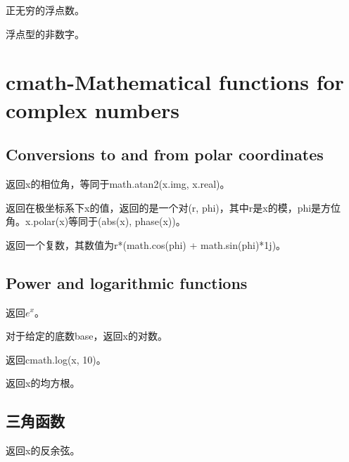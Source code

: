 \noindent{\color{red}{math.inf:}}
\par{正无穷的浮点数。}\\

\noindent{\color{red}{math.nan:}}
\par{浮点型的非数字。}\\





\section{cmath-Mathematical functions for complex numbers}
\subsection{Conversions to and from polar coordinates}
\noindent{\color{red}{cmath.phase(x):}}
\par{返回x的相位角，等同于math.atan2(x.img, x.real)。}\\

\noindent{\color{red}{cmath.polar(x):}}
\par{返回在极坐标系下x的值，返回的是一个对(r, phi)，其中r是x的模，phi是方位角。x.polar(x)等同于(abs(x), phase(x))。}\\

\noindent{\color{red}{cmath.rect(r, phi):}}
\par{返回一个复数，其数值为r*(math.cos(phi) + math.sin(phi)*1j)。}\\

\subsection{Power and logarithmic functions}
\noindent{\color{red}{cmath.exp(x):}}
\par{返回$e^x$。}\\

\noindent{\color{red}{cmath.log(x[, base]):}}
\par{对于给定的底数base，返回x的对数。}\\

\noindent{\color{red}{cmath.log10(x):}}
\par{返回cmath.log(x, 10)。}\\

\noindent{\color{red}{cmath.sqrt(x):}}
\par{返回x的均方根。}\\

\subsection{三角函数}
\noindent{\color{red}{cmath.acos(x):}}
\par{返回x的反余弦。}\\

